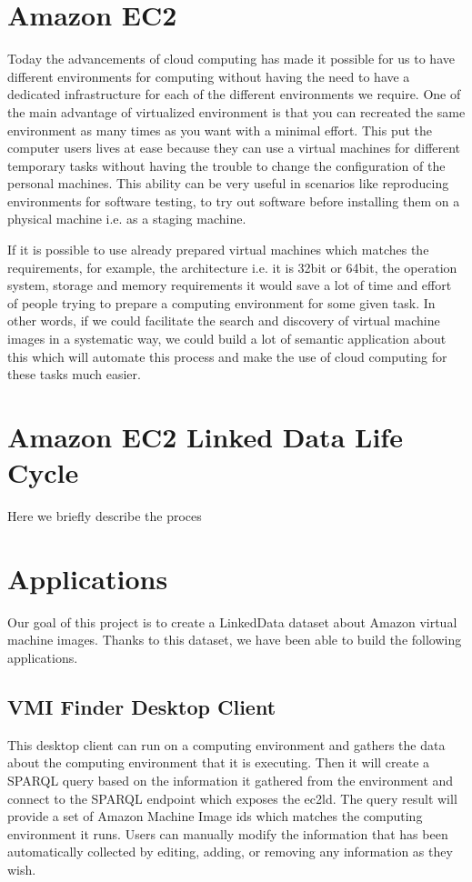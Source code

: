 \section{Amazon EC2}

Today the advancements of cloud computing has made it possible for us to have different environments for computing without having the need to have a dedicated infrastructure for each of the different environments we require.  One of the main advantage of virtualized environment is that you can recreated the same environment as many times as you want with a minimal effort. This put the computer users lives at ease because they can use a virtual machines for different temporary tasks without having the trouble to change the configuration of the personal machines. This ability can be very useful in scenarios like reproducing environments for software testing, to try out software before installing them on a physical machine i.e. as a staging machine. 

If it is possible to use already prepared virtual machines which matches the requirements, for example, the architecture i.e. it is 32bit or 64bit, the operation system, storage and memory requirements it would save a lot of time and effort of people trying to prepare a computing environment for some given task. In other words, if we could facilitate the search and discovery of virtual machine images in a systematic way, we could build a lot of semantic application about this which will automate this process and make the use of cloud computing for these tasks much easier. 


\section{Amazon EC2 Linked Data Life Cycle}
Here we briefly describe the proces

\section{Applications}
Our goal of this project is to create a LinkedData dataset about Amazon virtual machine images. Thanks to this dataset, we have been able to build the following applications.

\subsection{VMI Finder Desktop Client}
This desktop client can run on a computing environment and gathers the data about the computing environment that it is executing. Then it will create a SPARQL query based on the information it gathered from the environment and connect to the SPARQL endpoint which exposes the ec2ld. The query result will provide a set of Amazon Machine Image ids which matches the computing environment it runs.  Users can manually modify the information that has been automatically collected by editing, adding, or removing any information as they wish.  

